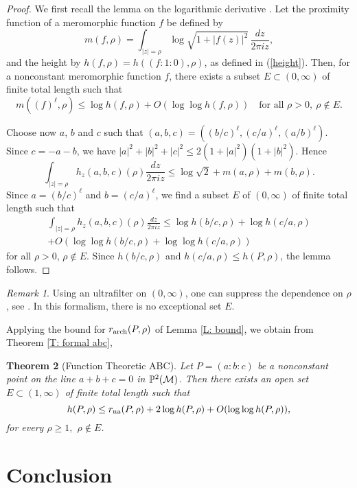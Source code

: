 \documentclass{amsart}
\newcommand\logder{\ell}
\newcommand\arch{{\textup{arch}}}	\newcommand\na{{\textup{na}}}
\newtheorem{theorem}{Theorem}[section]
\theoremstyle{definition}\newtheorem{definition}[theorem]{Definition}
\theoremstyle{remark}\newtheorem{remark}[theorem]{Remark}
\numberwithin{equation}{section}
\begin{document}
\begin{proof}
We first recall the lemma on the logarithmic derivative \cite[Theorem 6.1, p.\ 48]{LC}.
Let the proximity function of a meromorphic function $f$ be defined by
$$
m(f,\rho)=\int_{|z|=\rho}\log\sqrt{1+|f(z)|^2}\,\frac{dz}{2\pi iz},
$$
and the height by $h(f,\rho)=h((f:1:0),\rho)$,
as defined in (\ref{height}).
Then,
for a nonconstant meromorphic function $f$,
there exists a subset $E\subset(0,\infty)$ of finite total length such that
$$
m((f)^\logder,\rho)\leq\log h(f,\rho)+O(\log\log h(f,\rho))\quad\text{for all }\rho>0,\ \rho\not\in E.
$$

Choose now $a$,
$b$ and $c$ such that $(a,b,c)=\left((b/c)^\logder,(c/a)^\logder,(a/b)^\logder\right)$.
Since $c=-a-b$,
we have
$|a|^2+|b|^2+|c|^2\leq2(1+|a|^2)(1+|b|^2)$.
Hence
$$
\int_{|z|=\rho}h_z(a,b,c)(\rho)\frac{dz}{2\pi iz}\leq\log\sqrt2+m(a,\rho)+m(b,\rho).
$$
Since $a=(b/c)^\logder$ and $b=(c/a)^\logder$,
we find a subset $E$ of $(0,\infty)$ of finite total length such that
\begin{multline*}
\int_{|z|=\rho}h_z(a,b,c)(\rho)\frac{dz}{2\pi iz}\leq\log h(b/c,\rho)+\log h(c/a,\rho)\\
+O(\log\log h(b/c,\rho)+\log\log h(c/a,\rho))
\end{multline*}
for all $\rho>0$,
$\rho\not\in E$.
Since $h(b/c,\rho)$ and $h(c/a,\rho)\leq h(P,\rho)$,
 the lemma follows.
\end{proof}

\begin{remark}
Using an ultrafilter on $(0,\infty)$,
one can suppress the dependence on $\rho$,
see \cite{Philippon}.
In this formalism,
there is no exceptional set $E$.
\end{remark}

Applying the bound for $r_\arch(P,\rho)$ of Lemma \ref{L: bound},
we obtain from Theorem \ref{T: formal abc},

\begin{theorem}[Function Theoretic ABC]
Let\/ $P=(a:b:c)$ be a nonconstant point on the line\/ $a+b+c=0$ in\/ $\mathbb{P}^2(\mathcal{M})$.
Then there exists an open set\/ $E\subset(1,\infty)$ of finite total length such that
$$
h(P,\rho)\leq r_\na(P,\rho)+2\log h(P,\rho)+O(\log\log h(P,\rho)),
$$
for every $\rho\geq1,$
$\rho\not\in E$.
\end{theorem}

\section{Conclusion}
\label{S: conclusion}
\end{document}

